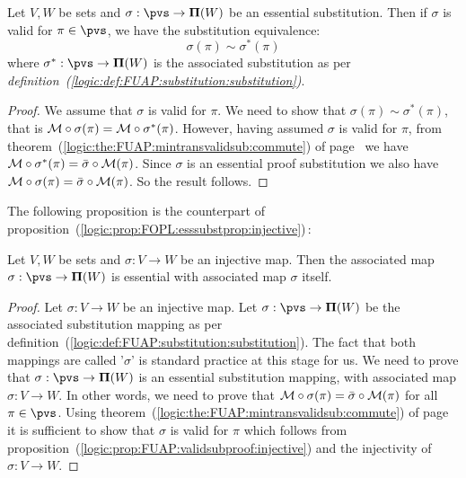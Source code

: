 \begin{prop}\label{logic:prop:FUAP:esssubstprop:validity}
Let $V,W$ be sets and $\sigma:\pvs\to{\bf\Pi}(W)$ be an essential
substitution. Then if $\sigma$ is valid for $\pi\in\pvs$, we have
the substitution equivalence:
    \[
    \sigma(\pi)\sim\sigma^{*}(\pi)
    \]
where $\sigma^{*}:\pvs\to{\bf\Pi}(W)$ is the associated substitution
as per {\em
definition~(\ref{logic:def:FUAP:substitution:substitution})}.
\end{prop}
\begin{proof}
We assume that $\sigma$ is valid for $\pi$. We need to show that
$\sigma(\pi)\sim\sigma^{*}(\pi)$, that is ${\cal
M}\circ\sigma(\pi)={\cal M}\circ\sigma^{*}(\pi)$. However, having
assumed $\sigma$ is valid for $\pi$, from
theorem~(\ref{logic:the:FUAP:mintransvalidsub:commute}) of
page~\pageref{logic:the:FUAP:mintransvalidsub:commute} we have
${\cal M}\circ\sigma^{*}(\pi)=\bar{\sigma}\circ{\cal M}(\pi)$. Since
$\sigma$ is an essential proof substitution we also have ${\cal
M}\circ\sigma(\pi)=\bar{\sigma}\circ{\cal M}(\pi)$. So the result
follows.
\end{proof}

The following proposition is the counterpart of
proposition~(\ref{logic:prop:FOPL:esssubstprop:injective})\,:

\begin{prop}\label{logic:prop:FUAP:esssubstprop:injective}
Let $V,W$ be sets and $\sigma:V\to W$ be an injective map. Then the
associated map $\sigma:\pvs\to{\bf\Pi}(W)$ is essential with
associated map $\sigma$ itself.
\end{prop}
\begin{proof}
Let $\sigma:V\to W$ be an injective map. Let $\sigma:\pvs\to{\bf
\Pi}(W)$ be the associated substitution mapping as per
definition~(\ref{logic:def:FUAP:substitution:substitution}). The
fact that both mappings are called '$\sigma$' is standard practice
at this stage for us. We need to prove that
$\sigma:\pvs\to{\bf\Pi}(W)$ is an essential substitution mapping,
with associated map $\sigma:V\to W$. In other words, we need to
prove that ${\cal M}\circ\sigma(\pi)=\bar{\sigma}\circ{\cal M}(\pi)$
for all $\pi\in\pvs$. Using
theorem~(\ref{logic:the:FUAP:mintransvalidsub:commute}) of
page~\pageref{logic:the:FUAP:mintransvalidsub:commute} it is
sufficient to show that $\sigma$ is valid for $\pi$ which follows
from proposition~(\ref{logic:prop:FUAP:validsubproof:injective}) and
the injectivity of $\sigma:V\to W$.
\end{proof}

